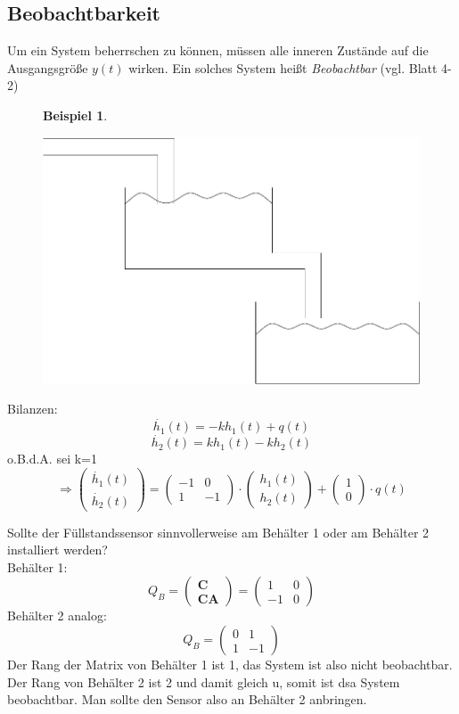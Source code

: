 \message{ !name(Mitschrieb_SysRegel.tex)}\documentclass[12pt,a4paper,ngerman]{scrartcl}
\newtheorem{bsp}{Beispiel}[section] %
\begin{document}
\subsection{Beobachtbarkeit}

Um ein System beherrschen zu können, müssen alle inneren Zustände auf die Ausgangsgröße $y(t)$ wirken. Ein solches System heißt \emph{Beobachtbar} (vgl. Blatt 4-2)
\begin{figure}[H]
\begin{bsp}
\end{bsp}
\centering
\includegraphics[width=.4\linewidth]{sysregel_bsp_4_2}
\end{figure}
Bilanzen:
\[
\dot{h_1}(t)=-kh_1(t)+q(t)
\]
\[
\dot{h_2}(t)=kh_1(t)-kh_2(t)
\]
o.B.d.A. sei k=1
\[
\Rightarrow
\begin{pmatrix}
  \dot{h_1}(t)\\
\dot{h_2}(t)
\end{pmatrix}
=
\begin{pmatrix}
  -1&0\\
1&-1
\end{pmatrix}
\cdot
\begin{pmatrix}
  h_1(t)\\
h_2(t)
\end{pmatrix}
+
\begin{pmatrix}
  1\\0
\end{pmatrix}
\cdot q(t)
\]

Sollte der Füllstandssensor sinnvollerweise am Behälter 1 oder am Behälter 2 installiert werden?\\
Behälter 1:
\[
Q_B=
\begin{pmatrix}
  \mathbf{C}\\
\mathbf{CA}
\end{pmatrix}
=
\begin{pmatrix}
  1&0\\
-1&0
\end{pmatrix}
\]
Behälter 2 analog:
\[
Q_B=
\begin{pmatrix}
  0&1\\
1&-1
\end{pmatrix}
\]
Der Rang der Matrix von Behälter 1 ist 1, das System ist also nicht beobachtbar. Der Rang von Behälter 2 ist 2 und damit gleich u, somit ist dsa System beobachtbar. Man sollte den Sensor also an Behälter 2 anbringen.
\end{document}

